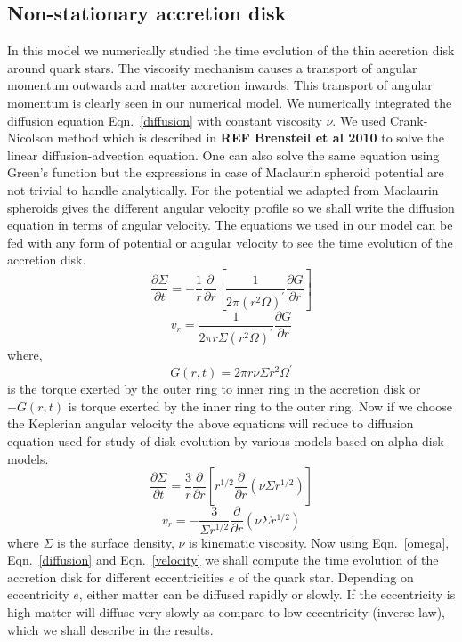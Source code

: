 \documentclass[useAMS,usenatbib]{mn2e}
\newcommand{\mref}[1]{\textbf{REF #1}}
\begin{document}
\subsection{Non-stationary accretion disk}
In this model we numerically studied the time evolution of the thin accretion disk around quark stars. The viscosity mechanism causes a transport of angular momentum outwards and matter accretion inwards. This transport of angular momentum is clearly seen in our numerical model. We numerically integrated the diffusion equation Eqn.~\ref{diffusion} with constant viscosity $\nu$. We used Crank-Nicolson method which is described in \mref{Brensteil et al 2010} to solve the linear diffusion-advection equation. One can also solve the same equation using Green's function but the expressions in case of Maclaurin spheroid potential are not trivial to handle analytically. For the potential we adapted from Maclaurin spheroids gives the different angular velocity profile so we shall write the diffusion equation in terms of angular velocity. The equations we used in our model can be fed with any form of potential or angular velocity to see the time evolution of the accretion disk.
\begin{equation}
\frac{\partial\Sigma}{\partial t} = -\frac{1}{r}\frac{\partial}{\partial r}\left[\frac{1}{2\pi(r^2\Omega)^\prime}\frac{\partial G}{\partial r}\right]
\label{diffusion}
\end{equation}
\begin{equation}
v_r = \frac{1}{2\pi r\Sigma (r^2\Omega)^\prime}\frac{\partial G}{\partial r}
\label{velocity}
\end{equation}
where,
\begin{equation}
G(r,t) = 2\pi r\nu\Sigma r^2 \Omega^\prime 
\end{equation}
is the torque exerted by the outer ring to inner ring in the accretion disk or $-G(r,t)$ is torque exerted by the inner ring to the outer ring. Now if we choose the Keplerian angular velocity the above equations will reduce to diffusion equation used for study of disk evolution by various models based on alpha-disk models.
\begin{equation}
\frac{\partial\Sigma}{\partial t} = \frac{3}{r}\frac{\partial}{\partial r}\left[r^{1/2}\frac{\partial}{\partial r}\left(\nu\Sigma r^{1/2}\right)\right]
\end{equation}
\begin{equation}
v_r = -\frac{3}{\Sigma r^{1/2}}\frac{\partial}{\partial r}\left(\nu\Sigma r^{1/2}\right)
\end{equation}
where $\Sigma$ is the surface density, $\nu$ is kinematic viscosity. Now using Eqn.~\ref{omega}, Eqn.~\ref{diffusion} and Eqn.~\ref{velocity} we shall compute the time evolution of the accretion disk for different eccentricities $e$ of the quark star. Depending on eccentricity $e$, either matter can be diffused rapidly or slowly. If the eccentricity is high matter will diffuse very slowly as compare to low eccentricity (inverse law), which we shall describe in the results.
\end{document}
